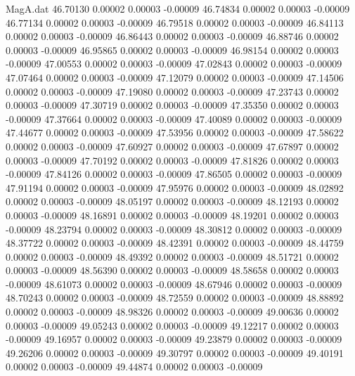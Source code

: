 \begin{filecontents}{MagA.dat}
  46.70130    0.00002    0.00003   -0.00009
  46.74834    0.00002    0.00003   -0.00009
  46.77134    0.00002    0.00003   -0.00009
  46.79518    0.00002    0.00003   -0.00009
  46.84113    0.00002    0.00003   -0.00009
  46.86443    0.00002    0.00003   -0.00009
  46.88746    0.00002    0.00003   -0.00009
  46.95865    0.00002    0.00003   -0.00009
  46.98154    0.00002    0.00003   -0.00009
  47.00553    0.00002    0.00003   -0.00009
  47.02843    0.00002    0.00003   -0.00009
  47.07464    0.00002    0.00003   -0.00009
  47.12079    0.00002    0.00003   -0.00009
  47.14506    0.00002    0.00003   -0.00009
  47.19080    0.00002    0.00003   -0.00009
  47.23743    0.00002    0.00003   -0.00009
  47.30719    0.00002    0.00003   -0.00009
  47.35350    0.00002    0.00003   -0.00009
  47.37664    0.00002    0.00003   -0.00009
  47.40089    0.00002    0.00003   -0.00009
  47.44677    0.00002    0.00003   -0.00009
  47.53956    0.00002    0.00003   -0.00009
  47.58622    0.00002    0.00003   -0.00009
  47.60927    0.00002    0.00003   -0.00009
  47.67897    0.00002    0.00003   -0.00009
  47.70192    0.00002    0.00003   -0.00009
  47.81826    0.00002    0.00003   -0.00009
  47.84126    0.00002    0.00003   -0.00009
  47.86505    0.00002    0.00003   -0.00009
  47.91194    0.00002    0.00003   -0.00009
  47.95976    0.00002    0.00003   -0.00009
  48.02892    0.00002    0.00003   -0.00009
  48.05197    0.00002    0.00003   -0.00009
  48.12193    0.00002    0.00003   -0.00009
  48.16891    0.00002    0.00003   -0.00009
  48.19201    0.00002    0.00003   -0.00009
  48.23794    0.00002    0.00003   -0.00009
  48.30812    0.00002    0.00003   -0.00009
  48.37722    0.00002    0.00003   -0.00009
  48.42391    0.00002    0.00003   -0.00009
  48.44759    0.00002    0.00003   -0.00009
  48.49392    0.00002    0.00003   -0.00009
  48.51721    0.00002    0.00003   -0.00009
  48.56390    0.00002    0.00003   -0.00009
  48.58658    0.00002    0.00003   -0.00009
  48.61073    0.00002    0.00003   -0.00009
  48.67946    0.00002    0.00003   -0.00009
  48.70243    0.00002    0.00003   -0.00009
  48.72559    0.00002    0.00003   -0.00009
  48.88892    0.00002    0.00003   -0.00009
  48.98326    0.00002    0.00003   -0.00009
  49.00636    0.00002    0.00003   -0.00009
  49.05243    0.00002    0.00003   -0.00009
  49.12217    0.00002    0.00003   -0.00009
  49.16957    0.00002    0.00003   -0.00009
  49.23879    0.00002    0.00003   -0.00009
  49.26206    0.00002    0.00003   -0.00009
  49.30797    0.00002    0.00003   -0.00009
  49.40191    0.00002    0.00003   -0.00009
  49.44874    0.00002    0.00003   -0.00009

\end{filecontents}
